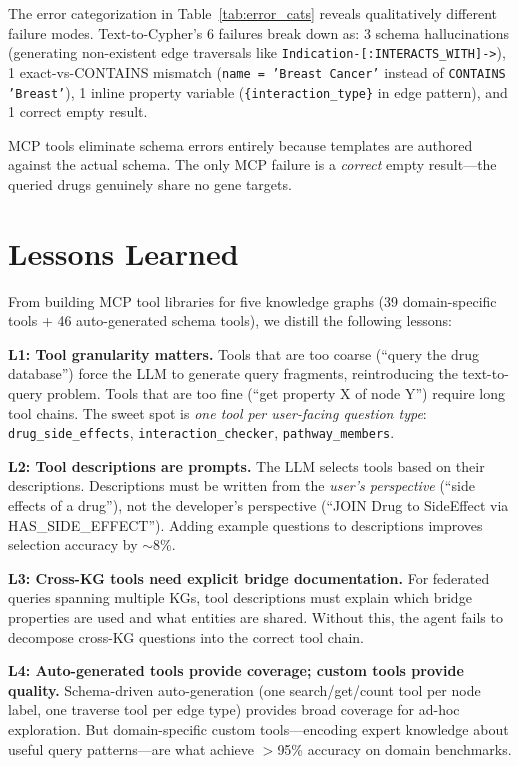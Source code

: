\documentclass[sigconf]{acmart}
\begin{document}
The error categorization in Table~\ref{tab:error_cats} reveals
qualitatively different failure modes.  Text-to-Cypher's 6
failures break down as: 3 schema hallucinations (generating
non-existent edge traversals like
\texttt{Indication-[:INTERACTS\_WITH]->}), 1 exact-vs-CONTAINS
mismatch (\texttt{name = 'Breast Cancer'} instead of
\texttt{CONTAINS 'Breast'}), 1 inline property variable
(\texttt{\{interaction\_type\}} in edge pattern), and 1 correct
empty result.

MCP tools eliminate schema errors entirely because templates
are authored against the actual schema.  The only MCP failure
is a \emph{correct} empty result---the queried drugs genuinely
share no gene targets.

\section{Lessons Learned}\label{sec:lessons}

From building MCP tool libraries for five knowledge graphs
(39 domain-specific tools + 46 auto-generated schema tools),
we distill the following lessons:

\smallskip\noindent\textbf{L1: Tool granularity matters.}
Tools that are too coarse (``query the drug database'') force
the LLM to generate query fragments, reintroducing the
text-to-query problem.  Tools that are too fine (``get property
X of node Y'') require long tool chains.  The sweet spot is
\emph{one tool per user-facing question type}: \texttt{drug\_side\_effects},
\texttt{interaction\_checker}, \texttt{pathway\_members}.

\smallskip\noindent\textbf{L2: Tool descriptions are prompts.}
The LLM selects tools based on their descriptions.
Descriptions must be written from the \emph{user's perspective}
(``side effects of a drug''), not the developer's perspective
(``JOIN Drug to SideEffect via HAS\_SIDE\_EFFECT'').
Adding example questions to descriptions improves selection
accuracy by ${\sim}$8\%.

\smallskip\noindent\textbf{L3: Cross-KG tools need explicit
bridge documentation.}
For federated queries spanning multiple KGs, tool descriptions
must explain which bridge properties are used and what entities
are shared.  Without this, the agent fails to decompose
cross-KG questions into the correct tool chain.

\smallskip\noindent\textbf{L4: Auto-generated tools provide
coverage; custom tools provide quality.}
Schema-driven auto-generation (one search/get/count tool per
node label, one traverse tool per edge type) provides broad
coverage for ad-hoc exploration.  But domain-specific custom
tools---encoding expert knowledge about useful query
patterns---are what achieve $>$95\% accuracy on domain benchmarks.
\end{document}
